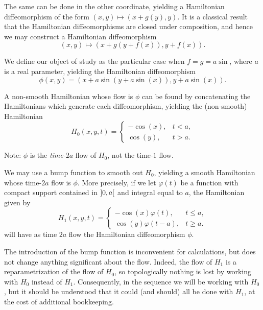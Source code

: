 The same can be done in the other coordinate, yielding a Hamiltonian diffeomorphism of the form $(x,y) \mapsto (x + g(y), y)$. It is a classical result that the Hamiltonian diffeomorphisms are closed under composition, and hence we may construct a Hamiltonian diffeomorphism
\begin{equation}
(x,y) \mapsto (x + g(y+f(x)), y+f(x)).
\end{equation}

We define our object of study as the particular case when $f = g = a \sin$, where $a$ is a real parameter, yielding the Hamiltonian diffeomorphism
\begin{equation}\label{eq:phi1def}
\phi(x,y) = ( x + a \sin(y + a \sin(x)), y + a \sin(x)).
\end{equation}

A non-smooth Hamiltonian whose flow is $\phi$ can be found by concatenating the Hamiltonians which generate each diffeomorphism, yielding the (non-smooth) Hamiltonian
\begin{equation}
H_0(x,y,t) = \begin{cases}
-\cos(x), & t < a,\\
\cos(y), & t > a.
\end{cases}
\end{equation}

Note: $\phi$ is the \emph{time-$2a$} flow of $H_0$, not the time-$1$ flow.

We may use a bump function to smooth out $H_0$, yielding a smooth Hamiltonian whose time-$2a$ flow is $\phi$. More precisely, if we let $\varphi(t)$ be a function with compact support contained in $\ointerval 0 a$ and integral equal to $a$, the Hamiltonian given by
\begin{equation}
\label{h1def}
H_1(x,y,t) = \begin{cases}
-\cos(x) \varphi(t), & t \leq a,\\
\cos(y) \varphi(t-a), & t \geq a.
\end{cases}
\end{equation}
will have as time $2a$ flow the Hamiltonian diffeomorphism $\phi$.

\begin{remark}\label{rmk:bump}
The introduction of the bump function is inconvenient for calculations, but does not change anything significant about the flow. Indeed, the flow of $H_1$ is a reparametrization of the flow of $H_0$, so topologically nothing is lost by working with $H_0$ instead of $H_1$. Consequently, in the sequence we will be working with $H_0$, but it should be understood that it could (and should) all be done with $H_1$, at the cost of additional bookkeeping.
\end{remark}

